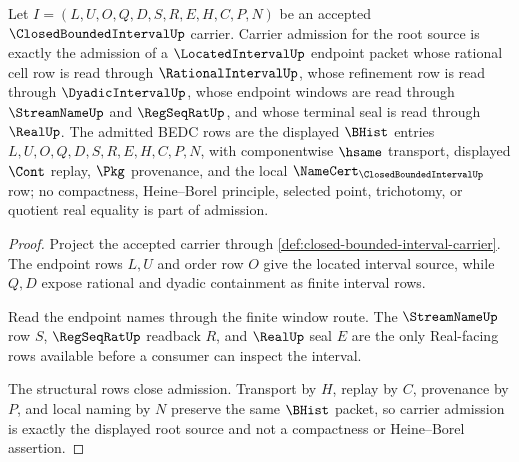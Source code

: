 \begin{theorem}
\label{thm:closed-bounded-interval-root-source-carrier-admission}
Let $I=(L,U,O,Q,D,S,R,E,H,C,P,N)$ be an accepted $\ClosedBoundedIntervalUp$ carrier. Carrier admission for the root source is exactly the admission of a $\LocatedIntervalUp$ endpoint packet whose rational cell row is read through $\RationalIntervalUp$, whose refinement row is read through $\DyadicIntervalUp$, whose endpoint windows are read through $\StreamNameUp$ and $\RegSeqRatUp$, and whose terminal seal is read through $\RealUp$. The admitted BEDC rows are the displayed $\BHist$ entries $L,U,O,Q,D,S,R,E,H,C,P,N$, with componentwise $\hsame$ transport, displayed $\Cont$ replay, $\Pkg$ provenance, and the local $\NameCert_{\ClosedBoundedIntervalUp}$ row; no compactness, Heine--Borel principle, selected point, trichotomy, or quotient real equality is part of admission.
\end{theorem}
\begin{proof}
Project the accepted carrier through \autoref{def:closed-bounded-interval-carrier}. The endpoint rows $L,U$ and order row $O$ give the located interval source, while $Q,D$ expose rational and dyadic containment as finite interval rows.

Read the endpoint names through the finite window route. The $\StreamNameUp$ row $S$, $\RegSeqRatUp$ readback $R$, and $\RealUp$ seal $E$ are the only Real-facing rows available before a consumer can inspect the interval.

The structural rows close admission. Transport by $H$, replay by $C$, provenance by $P$, and local naming by $N$ preserve the same $\BHist$ packet, so carrier admission is exactly the displayed root source and not a compactness or Heine--Borel assertion.
\end{proof}

